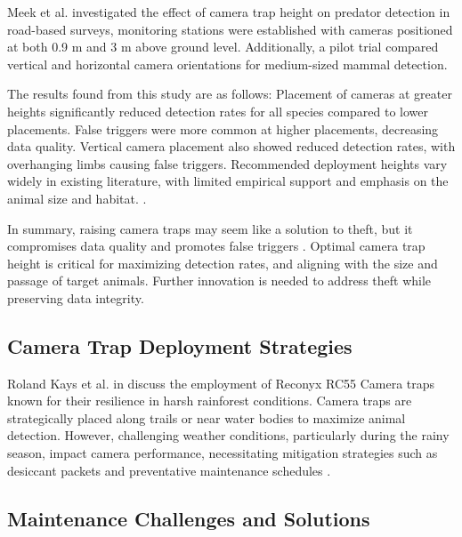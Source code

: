 \documentclass[class=report,11pt,crop=false]{standalone}
\begin{document}
Meek et al. \cite{meek2016higher} investigated the effect of camera trap height on predator detection in road-based surveys, monitoring stations were established with cameras positioned at both 0.9 m and 3 m above ground level. Additionally, a pilot trial compared vertical and horizontal camera orientations for medium-sized mammal detection. 

The results found from this study are as follows: Placement of cameras at greater heights significantly reduced detection rates for all species compared to lower placements. False triggers were more common at higher placements, decreasing data quality. Vertical camera placement also showed reduced detection rates, with overhanging limbs causing false triggers. Recommended deployment heights vary widely in existing literature, with limited empirical support and emphasis on the animal size and habitat. \cite{meek2016higher}. 

In summary, raising camera traps may seem like a solution to theft, but it compromises data quality and promotes false triggers \cite{meek2016higher}. Optimal camera trap height is critical for maximizing detection rates, and aligning with the size and passage of target animals. Further innovation is needed to address theft while preserving data integrity. 

 

\subsection{Camera Trap Deployment Strategies}

Roland Kays et al. in \cite{kays2009camera} discuss the employment of Reconyx RC55 Camera traps known for their resilience in harsh rainforest conditions. Camera traps are strategically placed along trails or near water bodies to maximize animal detection. However, challenging weather conditions, particularly during the rainy season, impact camera performance, necessitating mitigation strategies such as desiccant packets and preventative maintenance schedules \cite{kays2009camera}.

 

\subsection{Maintenance Challenges and Solutions}
\end{document}
